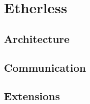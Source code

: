 \section{Etherless}
	\subsection{Architecture} %
	\subsection{Communication} %
	\subsection{Extensions} %